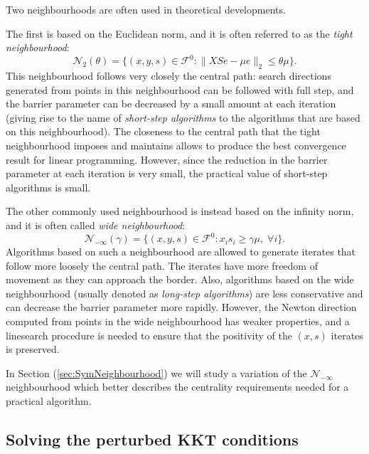 Two neighbourhoods are often used in theoretical developments.

The first is based on the Euclidean norm, and it is often referred
to as the {\em tight neighbourhood}:
\[
\mathcal{N}_2(\theta) = \{ (x,y,s) \in \mathcal{F}^0 :
                         \| XSe - \mu e \|_2 \le \theta\mu \}.
\]
This neighbourhood follows very closely the central path:
search directions generated from points in this neighbourhood can be 
followed with full step, and the barrier parameter can be decreased
by a small amount at each iteration (giving rise to the name
of {\em short-step algorithms} to the algorithms that are based on
this neighbourhood). 
The closeness to the central path that the tight neighbourhood
imposes and maintains allows to produce the best convergence result
for linear programming. 
However, since the reduction in the barrier parameter at each iteration 
is very small, the practical value of short-step algorithms is small.

The other commonly used neighbourhood is instead based on the infinity norm, 
and it is often called {\em wide neighbourhood}:
\[
\mathcal{N}_{-\infty}(\gamma) = \{ (x,y,s) \in \mathcal{F}^0 :
                         x_is_i \ge \gamma\mu, \; \forall i \}.
\]
Algorithms based on such a neighbourhood are allowed to generate
iterates that follow more loosely the central path. The iterates 
have more freedom of movement as they can approach the border.
Also, algorithms based on the wide neighbourhood (usually denoted as
{\em long-step algorithms}) are less conservative and can decrease 
the barrier parameter more rapidly.
However, the Newton direction computed from points in the wide 
neighbourhood  has weaker properties, and a linesearch procedure is
needed to ensure that the positivity of the $(x,s)$ iterates is
preserved.

In Section (\ref{sec:SymNeighbourhood}) we will study a variation
of the $\mathcal{N}_{-\infty}$ neighbourhood which better describes
the centrality requirements needed for a practical algorithm.



%
%
\subsection{Solving the perturbed KKT conditions}

